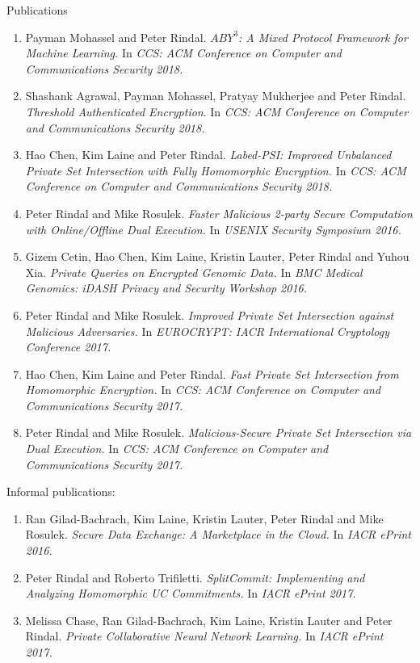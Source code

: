 \documentclass{resume} %
\begin{document}
\begin{rSection}{Publications}
\begin{enumerate}[label=C\arabic* --]
	\item Payman Mohassel and Peter Rindal. \emph{$ABY^3$: A Mixed Protocol Framework for Machine Learning.} In \emph{CCS: ACM Conference on Computer and Communications Security 2018.}
	
	\item Shashank Agrawal, Payman Mohassel, Pratyay Mukherjee and Peter Rindal. \emph{Threshold Authenticated Encryption}. In \emph{CCS: ACM Conference on Computer and Communications Security 2018.}	
	
	\item Hao Chen, Kim Laine and Peter Rindal. \emph{Labed-PSI: Improved Unbalanced Private Set Intersection with Fully Homomorphic Encryption.} In \emph{CCS: ACM Conference on Computer and Communications Security 2018.}
	
	
	\item Peter Rindal and Mike Rosulek. \emph{Faster Malicious 2-party Secure Computation with Online/Offline Dual Execution.} In \emph{USENIX Security Symposium 2016.}
	
	\item Gizem Cetin, Hao Chen, Kim Laine, Kristin Lauter, Peter Rindal and Yuhou Xia. \emph{Private Queries on Encrypted Genomic Data.} In \emph{BMC Medical Genomics:  iDASH Privacy and Security Workshop 2016.}
		
	\item Peter Rindal and Mike Rosulek. \emph{Improved Private Set Intersection against Malicious Adversaries.} In \emph{EUROCRYPT: IACR International Cryptology Conference 2017.}
	
	\item Hao Chen, Kim Laine and Peter Rindal. \emph{Fast Private Set Intersection from Homomorphic Encryption.} In \emph{CCS: ACM Conference on Computer and Communications Security 2017.}
	
	\item Peter Rindal and Mike Rosulek. \emph{Malicious-Secure Private Set Intersection via Dual Execution.} In \emph{CCS: ACM Conference on Computer and Communications Security 2017.}
\end{enumerate}

\bigskip 

\bigskip 
Informal publications:
\begin{enumerate}[label=I\arabic* --]
	
	\item Ran Gilad-Bachrach, Kim Laine, Kristin Lauter, Peter Rindal and Mike Rosulek. \emph{Secure Data Exchange: A Marketplace in the Cloud.} In \emph{IACR ePrint 2016.}
		
	\item Peter Rindal and Roberto Trifiletti. \emph{SplitCommit: Implementing and Analyzing Homomorphic UC Commitments.} In \emph{IACR ePrint 2017.}
	
	\item Melissa Chase, Ran Gilad-Bachrach, Kim Laine, Kristin Lauter and Peter Rindal. \emph{Private Collaborative Neural Network Learning.} In \emph{IACR ePrint 2017.}
\end{enumerate}
 

\end{rSection}
\end{document}
